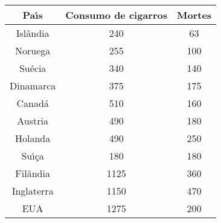 \documentclass[a4paper,11pt,twoside,openright]{report}
\begin{document}
\begin{center}
\begin{tabular}{l|l|l}
\hline
\multicolumn{1}{c|}{Pa\'{\i}s} & \multicolumn{1}{c|}{Consumo de cigarros} & \multicolumn{1}{c}{Mortes} \\ 
\hline
\multicolumn{1}{c|}{Isl\^{a}ndia} & \multicolumn{1}{c|}{240} & \multicolumn{1}{c}{63} \\ 
\multicolumn{1}{c|}{Noruega} & \multicolumn{1}{c|}{255} & \multicolumn{1}{c}{100} \\ 
\multicolumn{1}{c|}{Su\'{e}cia} & \multicolumn{1}{c|}{340} & \multicolumn{1}{c}{140} \\ 
\multicolumn{1}{c|}{Dinamarca} & \multicolumn{1}{c|}{375} & \multicolumn{1}{c}{175} \\ 
\multicolumn{1}{c|}{Canad\'{a}} & \multicolumn{1}{c|}{510} & \multicolumn{1}{c}{160} \\ 
\multicolumn{1}{c|}{Austria} & \multicolumn{1}{c|}{490} & \multicolumn{1}{c}{180} \\ 
\multicolumn{1}{c|}{Holanda} & \multicolumn{1}{c|}{490} & \multicolumn{1}{c}{250} \\ 
\multicolumn{1}{c|}{Su\'{\i}\c{c}a} & \multicolumn{1}{c|}{180} & \multicolumn{1}{c}{180} \\ 
\multicolumn{1}{c|}{Fil\^{a}ndia} & \multicolumn{1}{c|}{1125} & \multicolumn{1}{c}{360} \\ 
\multicolumn{1}{c|}{Inglaterra} & \multicolumn{1}{c|}{1150} & \multicolumn{1}{c}{470} \\ 
\multicolumn{1}{c|}{EUA} & \multicolumn{1}{c|}{1275} & \multicolumn{1}{c}{200} \\ 
\hline
\end{tabular}
\end{center}
\end{document}
